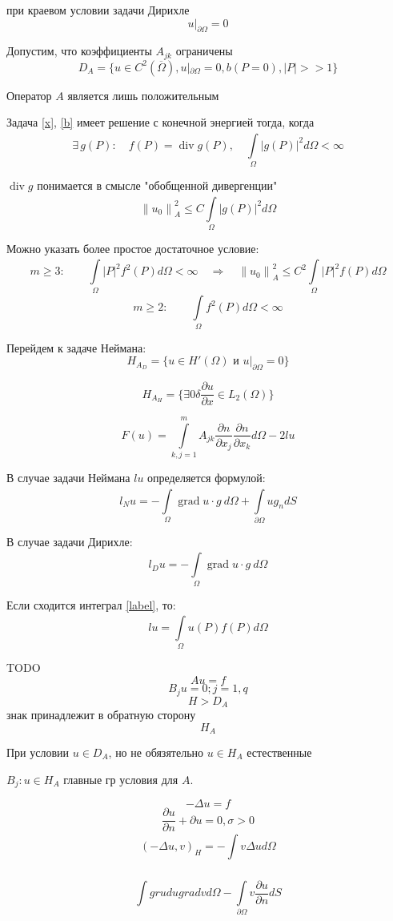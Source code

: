\documentclass[12pt, a4paper]{article}
\newcommand{\Int}{\int\limits}
\begin{document}
при краевом условии задачи Дирихле
\[ u|_{\partial \Omega} = 0\]

Допустим, что коэффициенты $A_{jk}$ ограничены
\[ D_A = \{u \in C^2(\overline{\Omega}), u|_{\partial \Omega} = 0, b(P = 0), |P| >> 1 \} \]

Оператор $A$ является лишь положительным

Задача \eqref{x}, \eqref{b} имеет решение с конечной энергией тогда, когда
\[ \exists \, g(P): \quad f(P) = \operatorname{div} g(P), \quad\Int_{\Omega}^{} {|g(P)|}^2 d\Omega < \infty \]

$\operatorname{div} g$ понимается в смысле "обобщенной дивергенции"
\[ {\|u_0\|}^2_A \leq C \Int_{\Omega}^{} {| g(P) |}^2 d \Omega \]

Можно указать более простое достаточное условие:
\[ m \geq 3: \qquad \Int_{\Omega}^{} {|P|}^2 f^2 (P) d\Omega < \infty \quad \Rightarrow \quad {\|u_0\|}_A^2 \leq C^2 \Int_{\Omega}^{}{|P|}^2 f (P)d\Omega \]
\[ m \geq 2: \qquad \Int_{\Omega}^{} f^2 (P) d\Omega < \infty \]

Перейдем к задаче Неймана:
\[ H_{A_D} = \{ u \in H' (\Omega) \textrm{ и } {u|}_{\partial  \Omega} = 0 \} \]

\[ H_{A_H} = \{ \exists 0 \delta \frac{\partial u}{\partial x} \in L_2(\Omega) \} \]

\[ F(u) = \Int_{k, j=1}^{m} A_{jk} \frac{\partial n}{\partial x_j} \frac{\partial n}{\partial  x_k} d \Omega - 2lu \]

В случае задачи Неймана $lu$ определяется формулой:
\[ l_N u = -\Int_{\Omega}^{} \operatorname{grad} u \cdot g \ d\Omega + \Int_{\partial \Omega}^{} u g_n d S \]

В случае задачи Дирихле:
\[ l_D u = -\Int_{\Omega}^{} \operatorname{grad} u \cdot g \ d\Omega \]

Если сходится интеграл \eqref{label}, то:
\[ lu = \Int_{\Omega}^{} u (P) f(P) d \Omega \]

TODO
\[ Au = f \]
\[ B_ju=0; j=1,q \]
\[ H > D_A \] знак принадлежит в обратную сторону
\[ H_A \]

При условии $ u \in D_A $, но не обязятельно $ u\in H_A $ естественные

$ B_j: u \in H_A $ главные гр условия для $A$.

\[ - \Delta u = f \]
\[ \frac{\partial u}{\partial n} + \partial u = 0, \sigma > 0 \]
\[ {(- \Delta u, v)}_H = - \Int_{}^{} v \Delta u d\Omega \]

\[ \Int_{}^{} grud u grad v d\Omega - \Int_{\partial \Omega}^{}v\frac{\partial u}{\partial n} dS \]
\end{document}
